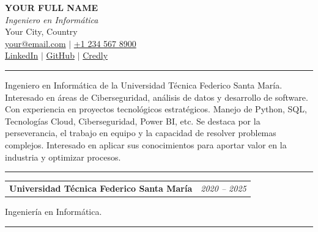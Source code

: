 \documentclass[11pt, a4paper]{article}
\begin{document}
\begin{center}
  {\LARGE\bfseries YOUR FULL NAME} \\
  \medskip
  {\itshape Ingeniero en Informática} \\
  Your City, Country \\
  \href{mailto:your@email.com}{your@email.com} $|$ \href{tel:+12345678900}{+1 234 567 8900} \\
  \href{https://linkedin.com/in/your-profile}{\textcolor{linkblue}{LinkedIn}} $|$ \href{https://github.com/your-username}{\textcolor{linkblue}{GitHub}} $|$ \href{https://www.credly.com/users/your-profile/}{\textcolor{linkblue}{Credly}}
\end{center}

\vspace{8pt}


\vspace{6pt}\vspace{2pt}\hrule\vspace{4pt}

\justifying Ingeniero en Informática de la Universidad Técnica Federico Santa María. Interesado en áreas de Ciberseguridad, análisis de datos y desarrollo de software. Con experiencia en proyectos tecnológicos estratégicos. Manejo de Python, SQL, Tecnologías Cloud, Ciberseguridad, Power BI, etc. Se destaca por la perseverancia, el trabajo en equipo y la capacidad de resolver problemas complejos. Interesado en aplicar sus conocimientos para aportar valor en la industria y optimizar procesos.


\vspace{6pt}\vspace{2pt}\hrule\vspace{4pt}

\noindent\begin{tabularx}{\linewidth}{@{}X r@{}}
  \textbf{Universidad Técnica Federico Santa María} & \textit{2020 -- 2025} \\
\end{tabularx}
\noindent Ingeniería en Informática.
\vspace{4pt}


\vspace{6pt}\vspace{2pt}\hrule\vspace{4pt}
\end{document}
